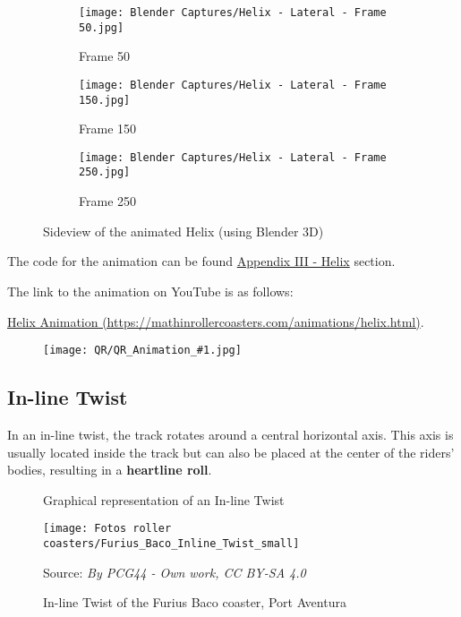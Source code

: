 \documentclass[12pt,twoside,a4paper]{article}
\newcommand{\source}[1]{\caption*{Source: \textit{#1}} }
\newcommand{\link}[1]{https://mathinrollercoasters.com/animations/#1.html}
\newcommand{\LinkToAnimation}[2]{
\noindent The code for the animation can be found \hyperref[sec:Appendix III_#1]{Appendix III - #1} section.

\noindent The link to the animation on YouTube is as follows:
	
\noindent \href{\link{#2}}{#1 Animation (\link{#2})}.
	
\begin{figure}[H]
	\centering
	\texttt{[image: QR/QR\_Animation\_\#1.jpg]}
\end{figure}
}
\begin{document}
	\begin{figure}[H]
		\centering
		\begin{subfigure}{.3\textwidth}
			\centering
			\texttt{[image: Blender Captures/Helix - Lateral - Frame 50.jpg]}
			\caption{Frame 50}
			\label{fig:sub1}
		\end{subfigure}%
		\begin{subfigure}{.3\textwidth}
			\centering
			\texttt{[image: Blender Captures/Helix - Lateral - Frame 150.jpg]}
			\caption{Frame 150}
			\label{fig:sub2}
		\end{subfigure}%
		\begin{subfigure}{.3\textwidth}
			\centering
			\texttt{[image: Blender Captures/Helix - Lateral - Frame 250.jpg]}
			\caption{Frame 250}
			\label{fig:sub3}
		\end{subfigure}%
		\caption{Sideview of the animated Helix (using Blender 3D)}
		\label{fig:Blender - Hèlix - Lateral}
	\end{figure}
	
	\LinkToAnimation{Helix}{helix}
	
	\cleardoublepage
	
	\subsection{In-line Twist}
	In an in-line twist, the track rotates around a central horizontal axis. This axis is usually located inside the track but can also be placed at the center of the riders' bodies, resulting in a \textbf{heartline roll}.
	
	\begin{figure}[H]
		\centering
		\caption{Graphical representation of an In-line Twist}
		\label{graph:In-line twist}
	\end{figure}
	
	\begin{figure}[H]
		\centering
		\texttt{[image: Fotos roller coasters/Furius\_Baco\_Inline\_Twist\_small]}
		\caption{In-line Twist of the Furius Baco coaster, Port Aventura}
		\label{fig:Furius Baco In-line Twist}
		\source{By PCG44 - Own work, CC BY-SA 4.0}
	\end{figure}
	
\end{document}

